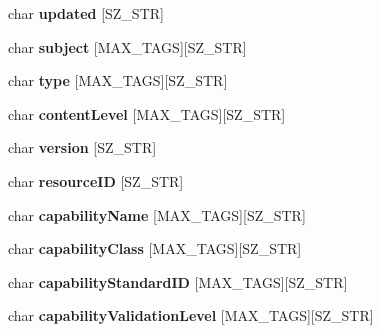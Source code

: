 \begin{CompactItemize}
\item 
\hypertarget{structVOTResource_14745de54e4717759e12b8e14f4e1668}{
char \textbf{updated} \mbox{[}SZ\_\-STR\mbox{]}}
\label{structVOTResource_14745de54e4717759e12b8e14f4e1668}

\item 
\hypertarget{structVOTResource_3de768bd2266401d3cc3a7b556529ce3}{
char \textbf{subject} \mbox{[}MAX\_\-TAGS\mbox{]}\mbox{[}SZ\_\-STR\mbox{]}}
\label{structVOTResource_3de768bd2266401d3cc3a7b556529ce3}

\item 
\hypertarget{structVOTResource_a42c079439ee21ac9606ac9bbe53ecac}{
char \textbf{type} \mbox{[}MAX\_\-TAGS\mbox{]}\mbox{[}SZ\_\-STR\mbox{]}}
\label{structVOTResource_a42c079439ee21ac9606ac9bbe53ecac}

\item 
\hypertarget{structVOTResource_119fd244198c62b33a57580c26ef29de}{
char \textbf{contentLevel} \mbox{[}MAX\_\-TAGS\mbox{]}\mbox{[}SZ\_\-STR\mbox{]}}
\label{structVOTResource_119fd244198c62b33a57580c26ef29de}

\item 
\hypertarget{structVOTResource_df105bfa891272fb1b7fde99698e1e3b}{
char \textbf{version} \mbox{[}SZ\_\-STR\mbox{]}}
\label{structVOTResource_df105bfa891272fb1b7fde99698e1e3b}

\item 
\hypertarget{structVOTResource_32952e960c92e0710e23e0dab7782ac2}{
char \textbf{resourceID} \mbox{[}SZ\_\-STR\mbox{]}}
\label{structVOTResource_32952e960c92e0710e23e0dab7782ac2}

\item 
\hypertarget{structVOTResource_a0e1c6663017bc31170433225cd2dc70}{
char \textbf{capabilityName} \mbox{[}MAX\_\-TAGS\mbox{]}\mbox{[}SZ\_\-STR\mbox{]}}
\label{structVOTResource_a0e1c6663017bc31170433225cd2dc70}

\item 
\hypertarget{structVOTResource_8967ff8454f9bae7ea64780993976564}{
char \textbf{capabilityClass} \mbox{[}MAX\_\-TAGS\mbox{]}\mbox{[}SZ\_\-STR\mbox{]}}
\label{structVOTResource_8967ff8454f9bae7ea64780993976564}

\item 
\hypertarget{structVOTResource_2d350e2008046f3dc82bfb2ece6a6787}{
char \textbf{capabilityStandardID} \mbox{[}MAX\_\-TAGS\mbox{]}\mbox{[}SZ\_\-STR\mbox{]}}
\label{structVOTResource_2d350e2008046f3dc82bfb2ece6a6787}

\item 
\hypertarget{structVOTResource_bcf4257bb72cbd45d96bc52bf2cc8d8a}{
char \textbf{capabilityValidationLevel} \mbox{[}MAX\_\-TAGS\mbox{]}\mbox{[}SZ\_\-STR\mbox{]}}
\label{structVOTResource_bcf4257bb72cbd45d96bc52bf2cc8d8a}


\end{CompactItemize}
